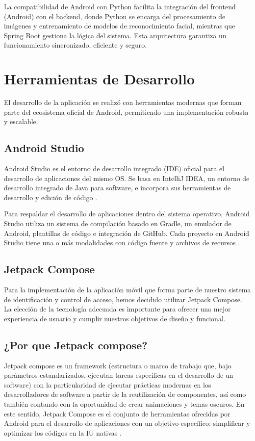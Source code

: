 La compatibilidad de Android con Python facilita la integración del frontend (Android) con el backend, donde Python se encarga del procesamiento de imágenes y entrenamiento de modelos de reconocimiento facial, mientras que Spring Boot gestiona la lógica del sistema. Esta arquitectura garantiza un funcionamiento sincronizado, eficiente y seguro.


\section{Herramientas de Desarrollo}
El desarrollo de la aplicación se realizó con herramientas modernas que forman parte del ecosistema oficial de Android, permitiendo una implementación robusta y escalable.

\subsection{Android Studio}
Android Studio es el entorno de desarrollo integrado (IDE) oficial para el desarrollo de aplicaciones del mismo OS. Se basa en IntelliJ IDEA, un entorno de desarrollo integrado de Java para software, e incorpora sus herramientas de desarrollo y edición de código \cite{CitaD19}.

Para respaldar el desarrollo de aplicaciones dentro del sistema operativo, Android Studio utiliza un sistema de compilación basado en Gradle, un emulador de Android, plantillas de código e integración de GitHub. Cada proyecto en Android Studio tiene una o más modalidades con código fuente y archivos de recursos \cite{CitaD19}.

\subsection{Jetpack Compose}
Para la implementación de la aplicación móvil que forma parte de nuestro sistema de identificación y control de acceso, hemos decidido utilizar Jetpack Compose. La elección de la tecnología adecuada es importante para ofrecer una mejor experiencia de usuario y cumplir nuestros objetivos de diseño y funcional. 

\subsection*{¿Por que Jetpack compose?}
Jetpack compose es un framework (estructura o marco de trabajo que, bajo parámetros estandarizados, ejecutan tareas específicas en el desarrollo de un software) con la particularidad de ejecutar prácticas modernas en los desarrolladores de software a partir de la reutilización de componentes, así como también contando con la oportunidad de crear animaciones y temas oscuros. En este sentido, Jetpack Compose es el conjunto de herramientas ofrecidas por Android para el desarrollo de aplicaciones con un objetivo específico: simplificar y optimizar los códigos en la IU nativas \cite{CitaA01}. 


